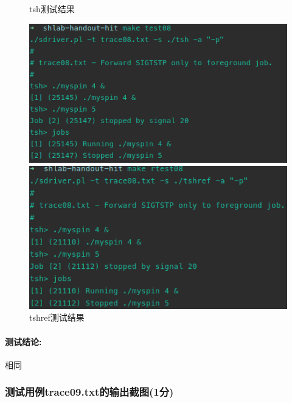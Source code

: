 \begin{figure}[H]
    \begin{minipage}[c]{0.5\linewidth}
        \centering
        \caption{tsh测试结果}
        \includegraphics[width=0.7\linewidth]{figures/test08.png}
    \end{minipage}
    \begin{minipage}[c]{0.5\linewidth}
        \centering
        \caption{tshref测试结果}
        \includegraphics[width=0.7\linewidth]{figures/rtest08.png}
    \end{minipage}
\end{figure}

\paragraph{测试结论:}相同

\subsubsection{测试用例trace09.txt的输出截图(1分)}

